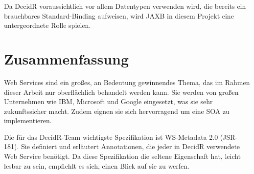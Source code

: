 \documentclass[runningheads]{llncs}
\newcommand{\decidr}{DecidR}
\begin{document}
    Da \decidr{} voraussichtlich vor allem Datentypen verwenden wird, die bereits ein brauchbares
    Standard-Binding aufweisen, wird JAXB in diesem Projekt eine untergeordnete Rolle spielen.

  \label{summary}
  \section{Zusammenfassung}
    Web Services sind ein großes, an Bedeutung gewinnendes Thema, das im Rahmen dieser Arbeit nur oberflächlich behandelt werden kann. Sie werden von großen Unternehmen wie IBM, Microsoft und Google eingesetzt, was sie sehr zukunftssicher macht. Zudem eignen sie sich hervorragend um eine SOA zu implementieren.

    Die für das \decidr{}-Team wichtigste Spezifikation ist WS-Metadata 2.0 (JSR-181)\cite{jsr_181}. Sie definiert und erläutert Annotationen, die jeder in \decidr{} verwendete Web Service benötigt. Da diese Spezifikation die seltene Eigenschaft hat, leicht lesbar zu sein, empfiehlt es sich, einen Blick auf sie zu werfen.


  \newpage

  \newpage
  \begin{flushleft}
    
    
  \end{flushleft}
\end{document}
